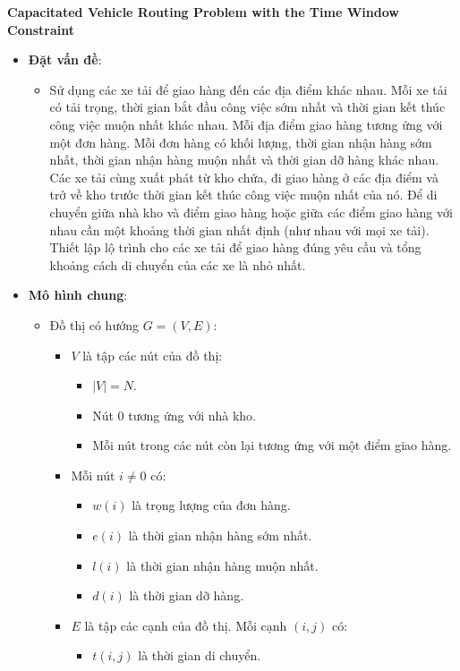 \documentclass{article}
\begin{document}
\textbf{Capacitated Vehicle Routing Problem with the Time Window Constraint}

\begin{itemize}
	\item \textbf{Đặt vấn đề}:
	\begin{itemize}
		\item Sử dụng các xe tải để giao hàng đến các địa điểm khác nhau. Mỗi xe tải có tải trọng, thời gian bắt đầu công việc sớm nhất và thời gian kết thúc công việc muộn nhất khác nhau. Mỗi địa điểm giao hàng tương ứng với một đơn hàng. Mỗi đơn hàng có khối lượng, thời gian nhận hàng sớm nhất, thời gian nhận hàng muộn nhất và thời gian dỡ hàng khác nhau. Các xe tải cùng xuất phát từ kho chứa, đi giao hàng ở các địa điểm và trở về kho trước thời gian kết thúc công việc muộn nhất của nó. Để di chuyển giữa nhà kho và điểm giao hàng hoặc giữa các điểm giao hàng với nhau cần một khoảng thời gian nhất định (như nhau với mọi xe tải). Thiết lập lộ trình cho các xe tải để giao hàng đúng yêu cầu và tổng khoảng cách di chuyển của các xe là nhỏ nhất.
	\end{itemize}
	\item \textbf{Mô hình chung}:
	\begin{itemize}
		\item Đồ thị có hướng $G = (V, E)$:
		\begin{itemize}
			\item $V$ là tập các nút của đồ thị:
			\begin{itemize}
				\item $|V| = N$.
				\item Nút $0$ tương ứng với nhà kho.
				\item Mỗi nút trong các nút còn lại tương ứng với một điểm giao hàng.
			\end{itemize}
			\item Mỗi nút $i \ne 0$ có:
			\begin{itemize}
				\item $w(i)$ là trọng lượng của đơn hàng.
				\item $e(i)$ là thời gian nhận hàng sớm nhất.
				\item $l(i)$ là thời gian nhận hàng muộn nhất.
				\item $d(i)$ là thời gian dỡ hàng.
			\end{itemize}
			\item $E$ là tập các cạnh của đồ thị. Mỗi cạnh $(i, j)$ có:
			\begin{itemize}
				\item $t(i, j)$ là thời gian di chuyển.

\end{itemize}
\end{itemize}
\end{itemize}
\end{itemize}
\end{document}
